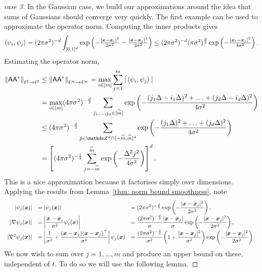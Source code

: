 \documentclass[smallextended]{svjour3}
\let\F\mathds\let\C\mathcal\newcommand{\R}{\F{R}}\newcommand{\A}{\tens{A}}
\newcommand{\norm}[1]{{\left\lVert #1 \right\rVert}}
\newcommand{\IP}[2]{\left\langle #1,#2 \right\rangle}
\newcommand{\1}{\F{1}}
\renewcommand{\hat}{\widehat}\renewcommand{\tilde}{\widetilde}
\newcommand*{\vard}[1]{%
	\IfEqCase{#1}{%
		{0}{\varphi}%
		{1}{\psi}%
	}[\varphi #1]%
}
\newcommand*{\varx}[1]{%
	\IfEqCase{#1}{%
		{0}{x}%
		{1}{y}%
		{2}{z}%
		{3}{r}%
	}[x#1]%
}
\newcommand*{\vvarx}[1]{\vec{\varx{#1}}}
\begin{document}
	\begin{proof}[case 3]
		In the Gaussian case, we build our approximations around the idea that sums of Gaussians should converge very quickly. The first example can be used to approximate the operator norm. Computing the inner products gives
		\begin{equation}
			\IP{\vard1_i}{\vard1_j} = (2\pi\sigma^2)^{-d}\int_{[0,1]^d} \exp\left(-\tfrac{|\vvarx0-\vvarx0_i|^2}{2\sigma^2}-\tfrac{|\vvarx0-\vvarx0_j|^2}{2\sigma^2}\right) \leq (2\pi\sigma^2)^{-d}(\pi\sigma^2)^{\frac{d}{2}}\exp\left(-\tfrac{|\vvarx0_i-\vvarx0_j|^2}{4\sigma^2}\right).
		\end{equation}
		Estimating the operator norm,
		\begin{align}
			\norm{\A\A^*}_{\ell^2\to\ell^2}&\leq \norm{\A\A^*}_{\ell^\infty\to\ell^\infty} = \max_{i\in[m]} \sum_{j=1}^m |\IP{\vard1_i}{\vard1_j}| 
			\\&= \max_{i\in[m]}(4\pi\sigma^2)^{-\frac d2}\sum_{j_1,\ldots,j_d\in[\hat m]} \exp\left(-\frac{(j_1\Delta-i_1\Delta)^2+\ldots+(j_d\Delta-i_d\Delta)^2}{4\sigma^2}\right)
			\\&\leq (4\pi\sigma^2)^{-\frac d2}\sum_{\vec j\in\F Z^d\cap[-\hat m,\hat m]^d} \exp\left(-\frac{(j_1\Delta)^2+\ldots+(j_d\Delta)^2}{4\sigma^2}\right)
			\\&= \left[(4\pi\sigma^2)^{-\frac 12}\sum_{j=-\hat m}^{\hat m} \exp\left(-\frac{\Delta^2j^2}{4\sigma^2}\right)\right]^d.
		\end{align}
		This is a nice approximation because it factorises simply over dimensions.
		Applying the results from Lemma~\ref{thm: norm bound smoothness}, note
		$$\begin{array}{rll}
			\displaystyle |\vard1_j(\vvarx0)| &\displaystyle= \left|\vard1_j(\vvarx0)\right| &\displaystyle = (2\pi\sigma^2)^{-\frac d2}\exp\left(-\frac{|\vvarx0-\vvarx0_j|^2}{2\sigma^2}\right),
			\\\displaystyle |\nabla\vard1_j(\vvarx0)| &\displaystyle= \left|\frac{\vvarx0-\vvarx0_j}{\sigma^2}\vard1_j(\vvarx0)\right| &\displaystyle = \frac{(2\pi\sigma^2)^{-\frac d2}}{\sigma}\frac{|\vvarx0-\vvarx0_j|}{\sigma}\exp\left(-\frac{|\vvarx0-\vvarx0_j|^2}{2\sigma^2}\right),
			\\|\nabla^2\vard1_j(\vvarx0)| &\displaystyle =\left|\frac1{\sigma^2} + \frac{(\vvarx0-\vvarx0_j)(\vvarx0-\vvarx0_j)^\top }{\sigma^4}\right|\vard1_j(\vvarx0) &\displaystyle = \frac{(2\pi\sigma^2)^{-\frac d2}}{\sigma^2}\left(1+\frac{|\vvarx0-\vvarx0_j|^2}{\sigma^2}\right)\exp\left(-\frac{|\vvarx0-\vvarx0_j|^2}{2\sigma^2}\right).
		\end{array}$$
		We now wish to sum over $j=1,\ldots,m$ and produce an upper bound on these, independent of $t$. To do so we will use the following lemma.
		

\end{proof}
\end{document}
